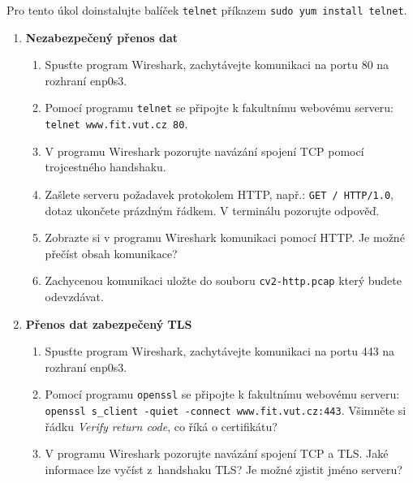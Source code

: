 \documentclass[a4paper,11pt]{article}
\begin{document}
Pro tento úkol doinstalujte balíček {\tt telnet} příkazem {\tt sudo yum install telnet}.

\begin{enumerate}

  \item {\bf  Nezabezpečený přenos dat}

    \begin{enumerate}

      \item Spusťte program Wireshark, zachytávejte komunikaci na portu 80 na rozhraní enp0s3.

      \item Pomocí programu {\tt telnet} se připojte k fakultnímu webovému serveru: \\
        \verb|telnet www.fit.vut.cz 80|.

      \item V programu Wireshark pozorujte navázání spojení TCP pomocí trojcestného handshaku.

      \item Zašlete serveru požadavek protokolem HTTP, např.:
        \verb|GET / HTTP/1.0|, dotaz ukončete prázdným řádkem.
        V terminálu pozorujte odpověď.

      \item Zobrazte si v programu Wireshark komunikaci pomocí HTTP.
        Je možné přečíst obsah komunikace?

      \item Zachycenou komunikaci uložte do souboru {\tt cv2-http.pcap} který budete odevzdávat.

    \end{enumerate}

  \item {\bf Přenos dat zabezpečený TLS}

    \begin{enumerate}

      \item Spusťte program Wireshark, zachytávejte komunikaci na portu 443 na rozhraní enp0s3.

      \item Pomocí programu {\tt openssl} se připojte k fakultnímu webovému serveru: \\
        \verb|openssl s_client -quiet -connect www.fit.vut.cz:443|.
        Všimněte si řádku \emph{Verify return code}, co říká o certifikátu?

      \item V programu Wireshark pozorujte navázání spojení TCP a TLS. Jaké
        informace lze vyčíst z~handshaku TLS? Je možné zjistit jméno serveru?


\end{enumerate}
\end{enumerate}
\end{document}
